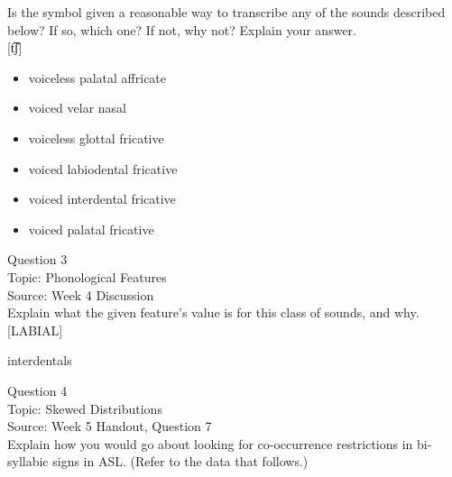 \documentclass[12pt]{article}
\begin{document}
Is the symbol given a reasonable way to transcribe any of the sounds described below? If so, which one? If not, why not? Explain your answer.\\

{[t͡ʃ]}

\begin{itemize} \item voiceless palatal affricate \item voiced velar nasal \item voiceless glottal fricative \item voiced labiodental fricative \item voiced interdental fricative \item voiced palatal fricative \end{itemize}


\newpage

{\large Question 3}\\

Topic: Phonological Features\\
Source: Week 4 Discussion\\

Explain what the given feature’s value is for this class of sounds, and why.\\

{[LABIAL]}

interdentals


\newpage

{\large Question 4}\\

Topic: Skewed Distributions\\
Source: Week 5 Handout, Question 7\\

Explain how you would go about looking for co-occurrence restrictions in bi-syllabic signs in ASL. (Refer to the data that follows.)\\
\end{document}
